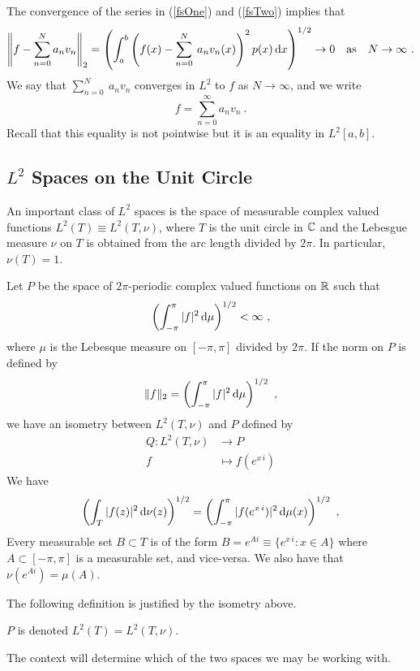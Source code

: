 The convergence of the series in (\ref{fsOne}) and (\ref{fsTwo})
implies that
\[
\left\| f - \sum_{n=0}^{N} a_n v_n \right\|_2
= \left( \int_a^b \left( f(x) - \sum_{n=0}^{N} \: a_n v_n(x) \right)^2
p(x) \,\mathrm{d}{x} \right)^{1/2} \rightarrow 0 \quad \text{as} \quad
N \rightarrow \infty \ .
\]
We say that $\displaystyle \sum_{n=0}^{N} \: a_n v_n$ converges in
$\displaystyle L^2$ to $f$ as $N\rightarrow \infty$, and we write
\[
 f = \sum_{n=0}^\infty a_n v_n \ .
\]
Recall that this equality is not pointwise but it is an equality in
$\displaystyle L^2[a,b]$.

\subsection{$\displaystyle L^2$ Spaces on the Unit Circle}

An important class of $\displaystyle L^2$ spaces is the space of
measurable complex valued functions $\displaystyle L^2(T) \equiv L^2(T,\nu)$,
where $T$ is the unit circle in $\mathbb{C}$ and the Lebesgue measure $\nu$
on $T$ is obtained from the arc length divided by $2\pi$.  In
particular, $\nu(T) =1$.

Let $P$ be the space of $2\pi$-periodic complex valued functions on
$\mathbb{R}$ such that
\[
\left(\int_{-\pi}^\pi |f|^2 \,\mathrm{d}{\mu}\right)^{1/2} < \infty \ ,
\]
where $\mu$ is the Lebesque measure on $[-\pi,\pi]$ divided by $2\pi$.
If the norm on $P$ is defined by
\[
\|f\|_2 = \left(\int_{-\pi}^\pi |f|^2 \,\mathrm{d}{\mu}\right)^{1/2} \ ,
\]
we have an isometry between $\displaystyle L^2(T,\nu)$ and $P$ defined by
\begin{align*}
Q: L^2(T,\nu) & \rightarrow P \\
  f & \mapsto f(e^{x\,i})
\end{align*}
We have
\[
\left(\int_T |f(z)|^2\dx{\nu}(z) \right)^{1/2}
= \left(\int_{-\pi}^\pi |f(e^{x\,i})|^2\dx{\mu}(x) \right)^{1/2}  \ ,
\]
Every measurable set $B \subset T$ is of the form
$\displaystyle B = e^{Ai} \equiv \{e^{x\,i} : x\in A\}$ where
$A \subset [-\pi,\pi]$
is a measurable set, and vice-versa.   We also have that
$\displaystyle \nu(e^{Ai}) = \mu(A)$.

The following definition is justified by the isometry above.

\begin{defn}
$P$ is denoted $\displaystyle L^2(T) = L^2(T,\nu)$.
\end{defn}

The context will determine which of the two spaces we may be working with.

